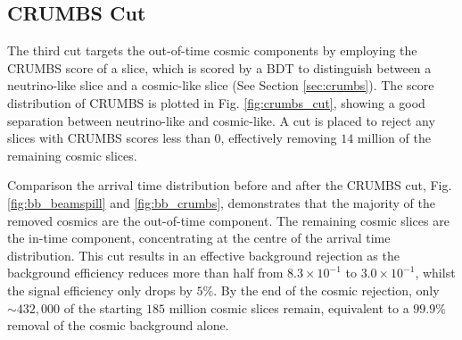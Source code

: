 \subsection{CRUMBS Cut}
\label{sec:cosmic_crumbs}

The third cut targets the out-of-time cosmic components by employing the CRUMBS score of a slice, which is scored by a BDT to distinguish between a neutrino-like slice and a cosmic-like slice (See Section \ref{sec:crumbs}). 
The score distribution of CRUMBS is plotted in Fig. \ref{fig:crumbs_cut}, showing a good separation between neutrino-like and cosmic-like.
A cut is placed to reject any slices with CRUMBS scores less than 0, effectively removing $14$ million of the remaining cosmic slices.

Comparison the arrival time distribution before and after the CRUMBS cut, Fig. \ref{fig:bb_beamspill} and \ref{fig:bb_crumbs}, demonstrates that the majority of the removed cosmics are the out-of-time component. 
The remaining cosmic slices are the in-time component, concentrating at the centre of the arrival time distribution.  
This cut results in an effective background rejection as the background efficiency reduces more than half from $8.3 \times 10^{-1}$ to $3.0 \times 10^{-1}$, whilst the signal efficiency only drops by $5 \%$.
By the end of the cosmic rejection, only $\sim432,000$ of the starting $185$ million cosmic slices remain, equivalent to a $99.9\%$ removal of the cosmic background alone.

